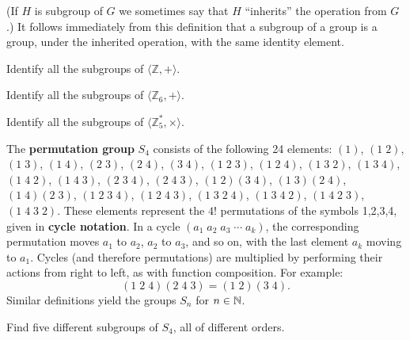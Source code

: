 (If \(H\) is subgroup of \(G\) we sometimes say that \(H\) ``inherits'' the operation from \(G\).) It follows immediately from this definition that a subgroup of a group is a group, under the inherited operation, with the same identity element.

\begin{problem}\label{prob:subgpex}
    \mbox{}
\begin{problemparts}
  \item Identify all the subgroups of \( \langle \mathbb{Z},+ \rangle \).
  \item Identify all the subgroups of \( \langle \mathbb{Z}_6,+ \rangle \).
  \item Identify all the subgroups of \( \langle \mathbb{Z}_5^*, \times \rangle \).
\end{problemparts}
\end{problem}

\begin{definition}
The \textbf{permutation group} $S_4$ consists of the following 24 elements: $(1)$, $(1\;2)$, $(1\;3)$, $(1\;4)$, $(2\;3)$, $(2\;4)$, $(3\;4)$, $(1\;2\;3)$, $(1\;2\;4)$,
$(1\;3\;2)$, $(1\;3\;4)$, $(1\;4\;2)$, $(1\;4\;3)$, $(2\;3\;4)$, $(2\;4\;3)$,
$(1\;2)(3\;4)$, $(1\;3)(2\;4)$, $(1\;4)(2\;3)$,
$(1\;2\;3\;4)$, $(1\;2\;4\;3)$, $(1\;3\;2\;4)$, $(1\;3\;4\;2)$, $(1\;4\;2\;3)$, $(1\;4\;3\;2)$. These elements represent the $4!$ permutations of the symbols 1,2,3,4, given in \textbf{cycle notation}. In a cycle $(a_1 \; a_2 \; a_3\; \cdots \; a_k)$, the corresponding permutation moves $a_1$ to $a_2$, $a_2$ to $a_3$, and so on, with the last element $a_k$ moving to $a_1$. Cycles (and therefore permutations) are multiplied by performing their actions from right to left, as with function composition. For example:
\[
(1\;2\;4)(2\; 4\; 3) = (1\; 2)(3\; 4).
\]
Similar definitions yield the groups $S_n$ for $n \in \mathbb{N}$.
\begin{annotation}
\end{annotation}
\end{definition}

\begin{problem}\label{prob:s4subgroups}
Find five different subgroups of \( S_4 \), all of different orders.
\end{problem}

